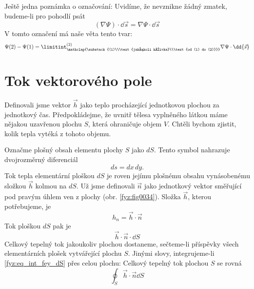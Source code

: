     Ještě jedna poznámka o označování: Uvidíme, že nevznikne žádný zmatek, budeme-li pro pohodlí psát
    \begin{equation}\label{fyz:eq269}
     (\nabla\Psi)\cdot\dd{\vec{s}} = \nabla\Psi\cdot\dd{\vec{s}}
    \end{equation}     
    V tomto označení má naše věta tento tvar:
    \begin{equation}\label{fyz:eq273}
     \Psi(2)-\Psi(1) =  
       \limitint_{\mathclap{\substack{(1)\\\text{jakákoli křivka}\\\text{od (1) do 
       (2)}}}}^{(2)}
         \nabla\Psi\cdot\dd{\vec{s}}
    \end{equation}

  \section{Tok vektorového pole}\label{fyz:IIchapIIIsecII}
    Definovali jsme vektor $\vec{h}$ jako teplo procházející jednotkovou plochou za jednotkový čas.
    Předpokládejme, že uvnitř tělesa vyplněného látkou máme nějakou uzavřenou plochu \(S\), která 
    ohraničuje objem \(V\). Chtěli bychom zjistit, kolik tepla vytéká z tohoto objemu.
    
    Označme plošný obsah elementu plochy \(S\) jako \(dS\). Tento symbol nahrazuje dvojrozměrný
    diferenciál
    \begin{equation}
      ds=dx\,dy.
    \end{equation}
    Tok tepla elementární ploškou \(dS\) je roven jejímu plošnému obsahu  vynásobenému složkou 
    $\vec{h}$ kolmou na \(dS\). Už jsme definovali $\vec{n}$ jako jednotkový vektor směřující pod 
    pravým úhlem ven z plochy (obr. \ref{fyz:fig0034}). Složka $\vec{h}$, kterou potřebujeme, je
    \begin{equation}
      h_n = \vec{h}\cdot\vec{n}
    \end{equation}
    Tok ploškou $dS$ pak je
    \begin{equation}\label{fyz:eq_int_fey_dS}
      \vec{h}\cdot\vec{n}\cdot\dd{S}
    \end{equation}
    Celkový tepelný tok jakoukoliv plochou dostaneme, sečteme-li příspěvky všech elementárních 
    plošek vytvářející plochu \(S\). Jinými slovy, integrujeme-li \ref{fyz:eq_int_fey_dS} přes 
    celou plochu: Celkový tepelný tok plochou \(S\) se rovná
    \begin{equation}
      \oint_S\vec{h}\cdot\vec{n}\dd{S}
    \end{equation}

